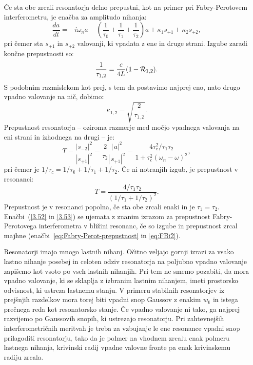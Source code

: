 Če sta obe zrcali resonatorja delno prepustni, kot na primer pri 
Fabry-Perotovem interferometru, je enačba za amplitudo nihanja:
\begin{equation}
\frac{da}{dt}=-i\omega_{n}a-\left(\frac{1}{\tau_{0}}+\frac{1}{\tau_{1}}+\frac{1}{\tau_{2}}\right)
a+\kappa_{1}s_{+1}+\kappa_{2}s_{+2},
\label{3.49}
\end{equation}
pri čemer sta $s_{+1}$ in $s_{+2}$ valovanji, ki vpadata z ene in druge strani.
Izgube zaradi končne prepustnosti so:
\begin{equation}
\frac{1}{\tau_{1,2}}=\frac{c}{4L}(1-{\cal R}_{1,2}).\label{3.50}
\end{equation}
S podobnim razmislekom kot prej, s tem da postavimo najprej eno, nato drugo
vpadno valovanje na nič, dobimo: 
\begin{equation}
\kappa_{1,2}=\sqrt{\frac{2}{\tau_{1,2}}}.
\label{3.51}
\end{equation}
Prepustnost resonatorja -- oziroma razmerje med močjo vpadnega valovanja
na eni strani in izhodnega na drugi -- je:
\begin{equation}
T=\frac{|s_{-2}|^{2}}{|s_{+1}|^{2}}=\frac{2}{\tau_{2}}\frac{|a|^{2}}{|s_{+1}|^{2}}=\frac{4\tau_c^{2}/
\tau_{1}\tau_{2}}{1+\tau_c^{2}(\omega_{n}-\omega)^{2}},
\label{3.52}
\end{equation}
pri čemer je $1/\tau_c=1/\tau_{0}+1/\tau_{1}+1/\tau_{2}$. 
 Če ni notranjih izgub, je prepustnost v resonanci:
\begin{equation}
T=\frac{4/\tau_{1}\tau_{2}}{(1/\tau_{1}+1/\tau_{2})^{2}}.
\label{3.53}
\end{equation}
Prepustnost je v resonanci popolna, če sta obe zrcali enaki in je $\tau_{1}=\tau_{2}$.
Enačbi~(\ref{3.52} in \ref{3.53}) se ujemata z znanim izrazom 
za prepustnost Fabry-Perotovega interferometra v bližini resonanc,
če so izgube in prepustnost zrcal majhne (enačbi~\ref{eq:Fabry-Perot-prepustnost} 
in \ref{eq:FBi2}). 

Resonatorji imajo mnogo lastnih nihanj. Očitno veljajo gornji izrazi
za vsako lastno nihanje posebej in celoten odziv resonatorja na poljubno vpadno
valovanje zapišemo kot vsoto po vseh lastnih nihanjih. Pri tem ne smemo pozabiti,
da mora vpadno valovanje, ki se sklaplja z izbranim lastnim nihanjem,
imeti prostorsko odvisnost, ki ustreza lastnemu stanju. V primeru
stabilnih resonatorjev iz prejšnjih razdelkov mora torej biti vpadni
snop Gaussov z enakim $w_{0}$ in istega prečnega reda kot resonatorsko
stanje. Če vpadno valovanje ni tako, ga najprej razvijemo po
Gaussovih snopih, ki ustrezajo resonatorju.
Pri zahtevnejših interferometričnih meritvah je treba za vzbujanje le ene 
resonance vpadni snop prilagoditi resonatorju, tako da je polmer na vhodnem 
zrcalu enak polmeru lastnega nihanja, krivinski radij vpadne valovne fronte 
pa enak krivinskemu radiju zrcala. 

